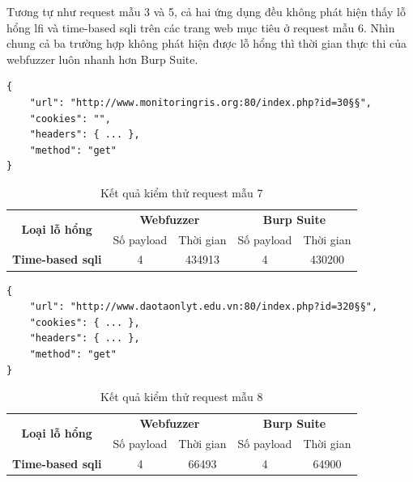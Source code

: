 \FloatBarrier
Tương tự như request mẫu 3 và 5, cả hai ứng dụng đều không phát hiện thấy lỗ hổng \acrshort{lfi} và time-based \acrshort{sqli} trên các trang web mục tiêu ở request mẫu 6. Nhìn chung cả ba trường hợp không phát hiện được lỗ hổng thì thời gian thực thi của webfuzzer luôn nhanh hơn Burp Suite.
\begin{lstlisting}[style=ES6, label={lst:base-request-7}, caption={Request mẫu 7 có lỗ hổng time-based \acrshort{sqli}}]
{
    "url": "http://www.monitoringris.org:80/index.php?id=30§§",
    "cookies": "",
    "headers": { ... },
    "method": "get"
}
\end{lstlisting}
\FloatBarrier
\begin{table}[ht]
    \centering
    \caption{Kết quả kiểm thử request mẫu 7}
    \label{tab:testing-result-7}
    \begin{tabular}[ht]{ccccc}
        \toprule[1pt]\midrule[0.3pt]
            \multirow{2}{*}{\textbf{Loại lỗ hổng}}&\multicolumn{2}{c}{\textbf{Webfuzzer}}&\multicolumn{2}{c}{\textbf{Burp Suite}}\\
            \cmidrule(lr){2-3}\cmidrule(lr){4-5}{}&Số payload&Thời gian&Số payload&Thời gian\\
        \midrule[0.3pt]
            \textbf{Time-based \acrshort{sqli}}&4&434913&4&430200\\
        \midrule[0.3pt]\bottomrule[1pt]
    \end{tabular}
\end{table}
\FloatBarrier
\begin{lstlisting}[style=ES6, label={lst:base-request-8}, caption={Request mẫu 8 có lỗ hổng time-based \acrshort{sqli}}]
{
    "url": "http://www.daotaonlyt.edu.vn:80/index.php?id=320§§",
    "cookies": { ... },
    "headers": { ... },
    "method": "get"
}
\end{lstlisting}
\FloatBarrier
\begin{table}[ht]
    \centering
    \caption{Kết quả kiểm thử request mẫu 8}
    \label{tab:testing-result-8}
    \begin{tabular}[ht]{ccccc}
        \toprule[1pt]\midrule[0.3pt]
            \multirow{2}{*}{\textbf{Loại lỗ hổng}}&\multicolumn{2}{c}{\textbf{Webfuzzer}}&\multicolumn{2}{c}{\textbf{Burp Suite}}\\
            \cmidrule(lr){2-3}\cmidrule(lr){4-5}{}&Số payload&Thời gian&Số payload&Thời gian\\
        \midrule[0.3pt]
            \textbf{Time-based \acrshort{sqli}}&4&66493&4&64900\\
        \midrule[0.3pt]\bottomrule[1pt]
    \end{tabular}
\end{table}
